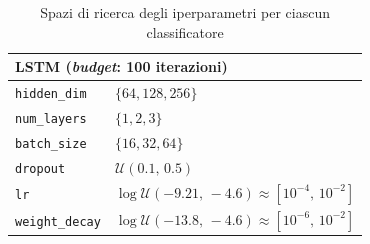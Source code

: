 \begin{table}[htbp]
\begin{tabular}{ll}
        \midrule
        \multicolumn{2}{l}{\textbf{LSTM} (\textit{budget}: 100 iterazioni)} \\
        \midrule
        \texttt{hidden\_dim} & $\{64, 128, 256\}$ \\
        \texttt{num\_layers} & $\{1, 2, 3\}$ \\
        \texttt{batch\_size} & $\{16, 32, 64\}$ \\
        \texttt{dropout} & $\mathcal{U}(0.1,\, 0.5)$ \\
        \texttt{lr} & $\log\mathcal{U}(-9.21,\, -4.6) \approx [10^{-4},\, 10^{-2}]$ \\
        \texttt{weight\_decay} & $\log\mathcal{U}(-13.8,\, -4.6) \approx [10^{-6},\, 10^{-2}]$ \\
        \bottomrule
    \end{tabular}
    \caption{Spazi di ricerca degli iperparametri per ciascun classificatore}
    \label{tab:search_spaces}
\end{table}
